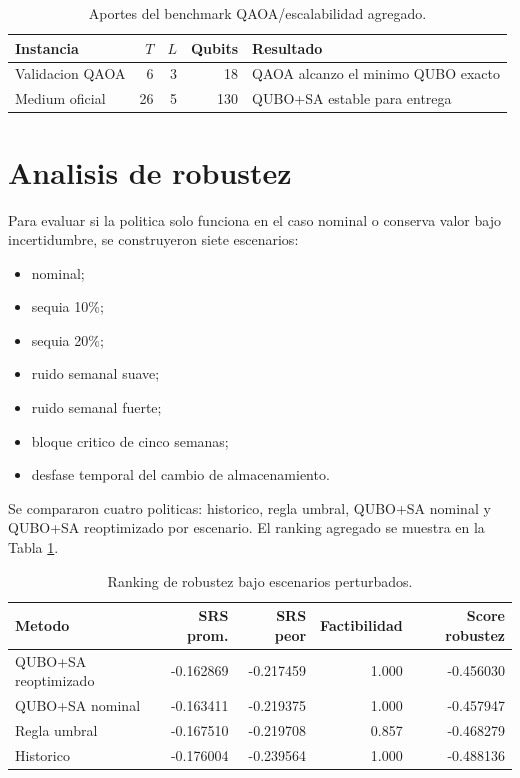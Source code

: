\documentclass[11pt,letterpaper]{article}
\begin{document}
\begin{table}[H]
\centering
\caption{Aportes del benchmark QAOA/escalabilidad agregado.}
\begin{tabular}{lrrrl}
\toprule
Instancia & $T$ & $L$ & Qubits & Resultado \\
\midrule
Validacion QAOA & 6 & 3 & 18 & QAOA alcanzo el minimo QUBO exacto \\
Medium oficial & 26 & 5 & 130 & QUBO+SA estable para entrega \\
\bottomrule
\end{tabular}
\end{table}

\section{Analisis de robustez}

Para evaluar si la politica solo funciona en el caso nominal o conserva valor
bajo incertidumbre, se construyeron siete escenarios:

\begin{itemize}
  \item nominal;
  \item sequia 10\%;
  \item sequia 20\%;
  \item ruido semanal suave;
  \item ruido semanal fuerte;
  \item bloque critico de cinco semanas;
  \item desfase temporal del cambio de almacenamiento.
\end{itemize}

Se compararon cuatro politicas: historico, regla umbral, QUBO+SA nominal y
QUBO+SA reoptimizado por escenario. El ranking agregado se muestra en la
Tabla \ref{tab:robustez}.

\begin{table}[H]
\centering
\caption{Ranking de robustez bajo escenarios perturbados.}
\label{tab:robustez}
\begin{tabular}{lrrrr}
\toprule
Metodo & SRS prom. & SRS peor & Factibilidad & Score robustez \\
\midrule
QUBO+SA reoptimizado & -0.162869 & -0.217459 & 1.000 & -0.456030 \\
QUBO+SA nominal & -0.163411 & -0.219375 & 1.000 & -0.457947 \\
Regla umbral & -0.167510 & -0.219708 & 0.857 & -0.468279 \\
Historico & -0.176004 & -0.239564 & 1.000 & -0.488136 \\
\bottomrule
\end{tabular}
\end{table}
\end{document}
